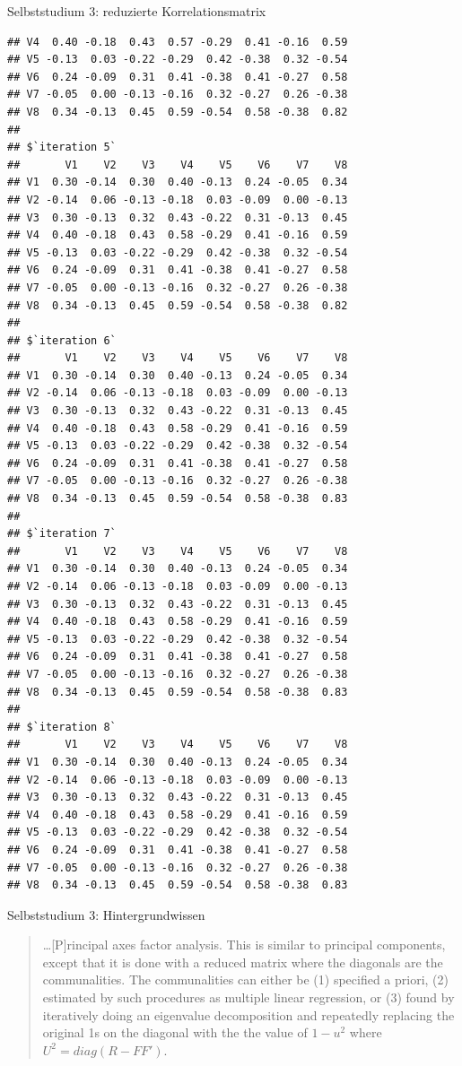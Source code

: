 \documentclass[
  ignorenonframetext,
]{beamer}
\begin{document}
\begin{frame}[fragile]{Selbststudium 3: reduzierte Korrelationsmatrix}
\begin{verbatim}
## V4  0.40 -0.18  0.43  0.57 -0.29  0.41 -0.16  0.59
## V5 -0.13  0.03 -0.22 -0.29  0.42 -0.38  0.32 -0.54
## V6  0.24 -0.09  0.31  0.41 -0.38  0.41 -0.27  0.58
## V7 -0.05  0.00 -0.13 -0.16  0.32 -0.27  0.26 -0.38
## V8  0.34 -0.13  0.45  0.59 -0.54  0.58 -0.38  0.82
## 
## $`iteration 5`
##       V1    V2    V3    V4    V5    V6    V7    V8
## V1  0.30 -0.14  0.30  0.40 -0.13  0.24 -0.05  0.34
## V2 -0.14  0.06 -0.13 -0.18  0.03 -0.09  0.00 -0.13
## V3  0.30 -0.13  0.32  0.43 -0.22  0.31 -0.13  0.45
## V4  0.40 -0.18  0.43  0.58 -0.29  0.41 -0.16  0.59
## V5 -0.13  0.03 -0.22 -0.29  0.42 -0.38  0.32 -0.54
## V6  0.24 -0.09  0.31  0.41 -0.38  0.41 -0.27  0.58
## V7 -0.05  0.00 -0.13 -0.16  0.32 -0.27  0.26 -0.38
## V8  0.34 -0.13  0.45  0.59 -0.54  0.58 -0.38  0.82
## 
## $`iteration 6`
##       V1    V2    V3    V4    V5    V6    V7    V8
## V1  0.30 -0.14  0.30  0.40 -0.13  0.24 -0.05  0.34
## V2 -0.14  0.06 -0.13 -0.18  0.03 -0.09  0.00 -0.13
## V3  0.30 -0.13  0.32  0.43 -0.22  0.31 -0.13  0.45
## V4  0.40 -0.18  0.43  0.58 -0.29  0.41 -0.16  0.59
## V5 -0.13  0.03 -0.22 -0.29  0.42 -0.38  0.32 -0.54
## V6  0.24 -0.09  0.31  0.41 -0.38  0.41 -0.27  0.58
## V7 -0.05  0.00 -0.13 -0.16  0.32 -0.27  0.26 -0.38
## V8  0.34 -0.13  0.45  0.59 -0.54  0.58 -0.38  0.83
## 
## $`iteration 7`
##       V1    V2    V3    V4    V5    V6    V7    V8
## V1  0.30 -0.14  0.30  0.40 -0.13  0.24 -0.05  0.34
## V2 -0.14  0.06 -0.13 -0.18  0.03 -0.09  0.00 -0.13
## V3  0.30 -0.13  0.32  0.43 -0.22  0.31 -0.13  0.45
## V4  0.40 -0.18  0.43  0.58 -0.29  0.41 -0.16  0.59
## V5 -0.13  0.03 -0.22 -0.29  0.42 -0.38  0.32 -0.54
## V6  0.24 -0.09  0.31  0.41 -0.38  0.41 -0.27  0.58
## V7 -0.05  0.00 -0.13 -0.16  0.32 -0.27  0.26 -0.38
## V8  0.34 -0.13  0.45  0.59 -0.54  0.58 -0.38  0.83
## 
## $`iteration 8`
##       V1    V2    V3    V4    V5    V6    V7    V8
## V1  0.30 -0.14  0.30  0.40 -0.13  0.24 -0.05  0.34
## V2 -0.14  0.06 -0.13 -0.18  0.03 -0.09  0.00 -0.13
## V3  0.30 -0.13  0.32  0.43 -0.22  0.31 -0.13  0.45
## V4  0.40 -0.18  0.43  0.58 -0.29  0.41 -0.16  0.59
## V5 -0.13  0.03 -0.22 -0.29  0.42 -0.38  0.32 -0.54
## V6  0.24 -0.09  0.31  0.41 -0.38  0.41 -0.27  0.58
## V7 -0.05  0.00 -0.13 -0.16  0.32 -0.27  0.26 -0.38
## V8  0.34 -0.13  0.45  0.59 -0.54  0.58 -0.38  0.83
\end{verbatim}
\end{frame}

\begin{frame}{Selbststudium 3: Hintergrundwissen}
\protect\hypertarget{selbststudium-3-hintergrundwissen}{}
\begin{quote}
\ldots{[}P{]}rincipal axes factor analysis. This is similar to principal
components, except that it is done with a reduced matrix where the
diagonals are the communalities. The communalities can either be (1)
specified a priori, (2) estimated by such procedures as multiple linear
regression, or (3) found by iteratively doing an eigenvalue
decomposition and repeatedly replacing the original 1s on the diagonal
with the the value of \(1 - u^2\) where \(U^2 = diag(R−FF')\).
\end{quote}
\end{frame}
\end{document}
